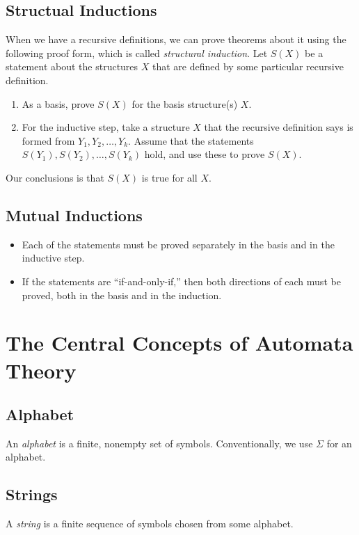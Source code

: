 \documentclass[]{article}
\begin{document}
  \subsection*{Structual Inductions}
    When we have a recursive definitions, we can prove theorems about it using
    the following proof form, which is called \emph{structural induction}. Let
    $S(X)$ be a statement about the structures $X$ that are defined by some
    particular recursive definition.
    \begin{enumerate}
      \item As a basis, prove $S(X)$ for the basis structure(s) $X$.
      \item For the inductive step, take a structure $X$ that the recursive
      definition says is formed from $Y_1, Y_2, \ldots, Y_k$. Assume that the
      statements \\ $S(Y_1), S(Y_2),\ldots, S(Y_k)$ hold, and use these to 
      prove $S(X)$.
    \end{enumerate}  
  Our conclusions is that $S(X)$ is true for all $X$.
  
  \subsection*{Mutual Inductions}
    \begin{itemize}
      \item Each of the statements must be proved separately in the basis and
      in the inductive step.
      \item If the statements are ``if-and-only-if,'' then both directions of
      each must be proved, both in the basis and in the induction.
    \end{itemize}
    
\section*{The Central Concepts of Automata Theory}
  \subsection*{Alphabet}
    An \emph{alphabet} is a finite, nonempty set of symbols. Conventionally, we
    use $\Sigma$ for an alphabet.
  
  \subsection*{Strings}
    A \emph{string} is a finite sequence of symbols chosen from some alphabet.
  
\end{document}
